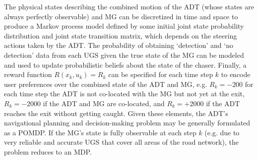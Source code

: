 The physical states describing the combined motion of the ADT (whose states are always perfectly observable) and MG can be discretized in time and space to produce a Markov process model defined by some initial joint state probability distribution and joint state transition matrix, which depends on the steering actions taken by the ADT. The probability of obtaining `detection' and `no detection' data from each UGS given the true state of the MG can be modeled and used to update probabilistic beliefs about the state of the chaser. Finally, a reward function $R(x_k,u_k) = R_k$ can be specified for each time step $k$ to encode user preferences over the combined state of the ADT and MG, e.g. $R_k = -200$ for each time step the ADT is not co-located with the MG but not yet at the exit, $R_k= -2000$ if the ADT and MG are co-located, and $R_k=+2000$ if the ADT reaches the exit without getting caught. Given these elements, the ADT's navigational planning and decision-making problem may be generally formulated as a POMDP. If the MG's state is fully observable at each step $k$ (e.g. due to very reliable and accurate UGS that cover all areas of the road network), the problem reduces to an MDP. 

%
%
%
%
%

